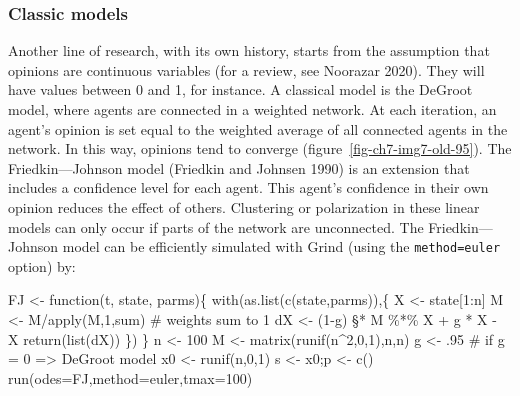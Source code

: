 \documentclass[
  a4paper,
  DIV=11,
  numbers=noendperiod,
  oneside]{scrreprt}
\newenvironment{Shaded}{}{}
\newcommand{\AttributeTok}[1]{\textcolor[rgb]{0.84,0.23,0.29}{#1}}
\newcommand{\CommentTok}[1]{\textcolor[rgb]{0.42,0.45,0.49}{#1}}
\newcommand{\ControlFlowTok}[1]{\textcolor[rgb]{0.84,0.23,0.29}{#1}}
\newcommand{\DecValTok}[1]{\textcolor[rgb]{0.00,0.36,0.77}{#1}}
\newcommand{\FunctionTok}[1]{\textcolor[rgb]{0.44,0.26,0.76}{#1}}
\newcommand{\NormalTok}[1]{\textcolor[rgb]{0.14,0.16,0.18}{#1}}
\newcommand{\OtherTok}[1]{\textcolor[rgb]{0.44,0.26,0.76}{#1}}
\newcommand{\SpecialCharTok}[1]{\textcolor[rgb]{0.00,0.36,0.77}{#1}}
\newcommand{\StringTok}[1]{\textcolor[rgb]{0.01,0.18,0.38}{#1}}
\begin{document}
\subsubsection{Classic models}\label{sec-Classic-models}

Another line of research, with its own history, starts from the
assumption that opinions are continuous variables (for a review, see
Noorazar 2020). They will have values between 0 and 1, for instance. A
classical model is the DeGroot model, where agents are connected in a
weighted network. At each iteration, an agent's opinion is set equal to
the weighted average of all connected agents in the network. In this
way, opinions tend to converge (figure~\ref{fig-ch7-img7-old-95}). The
Friedkin---Johnson model (Friedkin and Johnsen 1990) is an extension
that includes a confidence level for each agent. This agent's confidence
in their own opinion reduces the effect of others. Clustering or
polarization in these linear models can only occur if parts of the
network are unconnected. The Friedkin---Johnson model can be efficiently
simulated with Grind (using the
\texttt{method=\textquotesingle{}euler\textquotesingle{}} option) by:

\begin{Shaded}
\begin{Highlighting}[]
\NormalTok{FJ }\OtherTok{\textless{}{-}} \ControlFlowTok{function}\NormalTok{(t, state, parms)\{}
  \FunctionTok{with}\NormalTok{(}\FunctionTok{as.list}\NormalTok{(}\FunctionTok{c}\NormalTok{(state,parms)),\{}
\NormalTok{    X }\OtherTok{\textless{}{-}}\NormalTok{ state[}\DecValTok{1}\SpecialCharTok{:}\NormalTok{n]}
\NormalTok{    M }\OtherTok{\textless{}{-}}\NormalTok{ M}\SpecialCharTok{/}\FunctionTok{apply}\NormalTok{(M,}\DecValTok{1}\NormalTok{,sum) }\CommentTok{\# weights sum to 1}
\NormalTok{    dX }\OtherTok{\textless{}{-}}\NormalTok{ (}\DecValTok{1}\SpecialCharTok{{-}}\NormalTok{g) §}\SpecialCharTok{*}\NormalTok{ M }\SpecialCharTok{\%*\%}\NormalTok{ X  }\SpecialCharTok{+}\NormalTok{ g }\SpecialCharTok{*}\NormalTok{ X }\SpecialCharTok{{-}}\NormalTok{ X}
    \FunctionTok{return}\NormalTok{(}\FunctionTok{list}\NormalTok{(dX))}
\NormalTok{  \})}
\NormalTok{\}}
\NormalTok{n }\OtherTok{\textless{}{-}} \DecValTok{100}
\NormalTok{M }\OtherTok{\textless{}{-}} \FunctionTok{matrix}\NormalTok{(}\FunctionTok{runif}\NormalTok{(n}\SpecialCharTok{\^{}}\DecValTok{2}\NormalTok{,}\DecValTok{0}\NormalTok{,}\DecValTok{1}\NormalTok{),n,n)}
\NormalTok{g }\OtherTok{\textless{}{-}}\NormalTok{ .}\DecValTok{95} \CommentTok{\# if g  = 0 =\textgreater{} DeGroot model}
\NormalTok{x0 }\OtherTok{\textless{}{-}} \FunctionTok{runif}\NormalTok{(n,}\DecValTok{0}\NormalTok{,}\DecValTok{1}\NormalTok{)}
\NormalTok{s }\OtherTok{\textless{}{-}}\NormalTok{ x0;p  }\OtherTok{\textless{}{-}} \FunctionTok{c}\NormalTok{() }
\FunctionTok{run}\NormalTok{(}\AttributeTok{odes=}\NormalTok{FJ,}\AttributeTok{method=}\StringTok{\textquotesingle{}euler\textquotesingle{}}\NormalTok{,}\AttributeTok{tmax=}\DecValTok{100}\NormalTok{)}
\end{Highlighting}
\end{Shaded}
\end{document}
